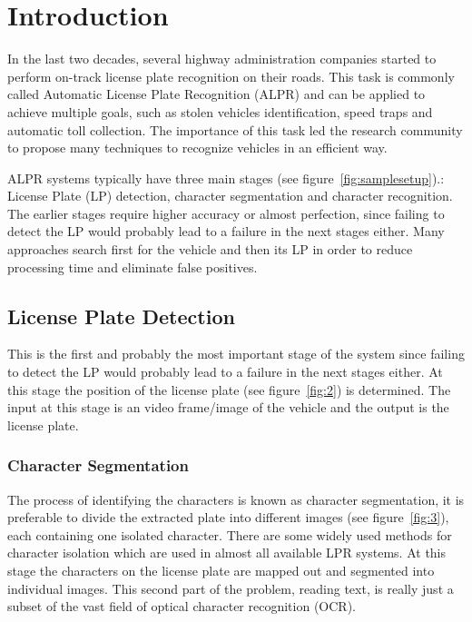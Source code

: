 \documentclass[letterpaper,12pt]{article}
\begin{document}
\section{Introduction}

In the last two decades, several highway administration companies started to perform on-track license plate recognition
on their roads. This task is commonly called Automatic License Plate Recognition (ALPR) and can be applied to achieve
multiple goals, such as stolen vehicles identification, speed traps and automatic toll collection. The importance of this
task led the research community to propose many techniques to recognize vehicles in an efficient way.

ALPR systems typically have three main stages (see figure~\ref{fig:samplesetup}).: License Plate (LP) detection, character segmentation and character recognition. The earlier stages require higher accuracy or almost perfection, since failing to detect the LP would probably lead to a failure in the next stages either. Many approaches search first for the vehicle and then its LP in order to reduce processing time and eliminate false positives.

\subsection{License Plate Detection}
This is the first and probably the most important stage of the system since failing to detect the LP would probably
lead to a failure in the next stages either. At this stage the position of the license plate (see figure~\ref{fig:2}) is determined. The input at this stage is an video frame/image of the vehicle and the output is the license plate. 

\subsubsection{Character Segmentation}
The process of identifying the characters is known as character segmentation, it is preferable to divide the extracted plate into different images (see figure~\ref{fig:3}), each containing one isolated character. There are some widely used methods for character isolation which are used in almost all available LPR systems. At this stage the characters on the license plate are mapped out and segmented into individual images. This second part of the problem, reading text, is really just a subset of the vast field of optical character recognition (OCR).
\end{document}
